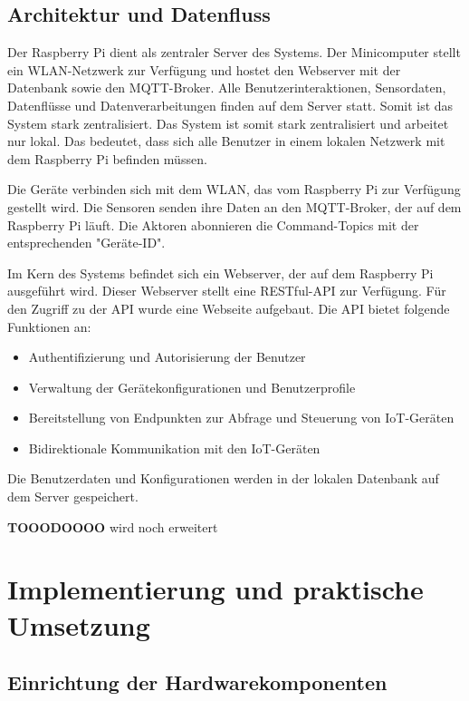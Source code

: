 \documentclass[12pt, letterpaper]{article}
\begin{document}
\subsection{Architektur und Datenfluss}
\par Der Raspberry Pi dient als zentraler Server des Systems. Der Minicomputer stellt ein WLAN-Netzwerk zur Verfügung und hostet den Webserver mit der Datenbank sowie den MQTT-Broker. Alle Benutzerinteraktionen, Sensordaten, Datenflüsse und Datenverarbeitungen finden auf dem Server statt. Somit ist das System stark zentralisiert. Das System ist somit stark zentralisiert und arbeitet nur lokal. Das bedeutet, dass sich alle Benutzer in einem lokalen Netzwerk mit dem Raspberry Pi befinden müssen. 
\par Die Geräte verbinden sich mit dem WLAN, das vom Raspberry Pi zur Verfügung gestellt wird. Die Sensoren senden ihre Daten an den MQTT-Broker, der auf dem Raspberry Pi läuft. Die Aktoren abonnieren die Command-Topics mit der entsprechenden "Geräte-ID".
\par Im Kern des Systems befindet sich ein Webserver, der auf dem Raspberry Pi ausgeführt wird. Dieser Webserver stellt eine RESTful-API zur Verfügung. Für den Zugriff zu der API wurde eine Webseite aufgebaut. Die API bietet folgende Funktionen an:
\begin{itemize}
  \item Authentifizierung und Autorisierung der Benutzer
  \item Verwaltung der Gerätekonfigurationen und Benutzerprofile
  \item Bereitstellung von Endpunkten zur Abfrage und Steuerung von IoT-Geräten
  \item Bidirektionale Kommunikation mit den IoT-Geräten
\end{itemize}
\par Die Benutzerdaten und Konfigurationen werden in der lokalen Datenbank auf dem Server gespeichert. 
\par \textbf{TOOODOOOO} wird noch erweitert
\newpage
\section{Implementierung und praktische Umsetzung}
\subsection{Einrichtung der Hardwarekomponenten}
\end{document}
